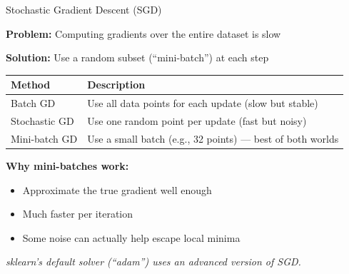 \documentclass[10pt]{beamer}
\begin{document}
\begin{frame}{Stochastic Gradient Descent (SGD)}

  \textbf{Problem:} Computing gradients over the entire dataset is slow

  \vspace{0.5em}
  \textbf{Solution:} Use a random subset (``mini-batch'') at each step

  \vspace{1em}
  \begin{center}
  \begin{tabular}{lp{7cm}}
    \toprule
    \textbf{Method} & \textbf{Description} \\
    \midrule
    Batch GD & Use all data points for each update (slow but stable) \\
    Stochastic GD & Use one random point per update (fast but noisy) \\
    Mini-batch GD & Use a small batch (e.g., 32 points) --- best of both worlds \\
    \bottomrule
  \end{tabular}
  \end{center}

  \vspace{1em}
  \textbf{Why mini-batches work:}
  \begin{itemize}
    \item Approximate the true gradient well enough
    \item Much faster per iteration
    \item Some noise can actually help escape local minima
  \end{itemize}

  \vspace{0.5em}
  \textit{sklearn's default solver (``adam'') uses an advanced version of SGD.}
\end{frame}

\end{document}
